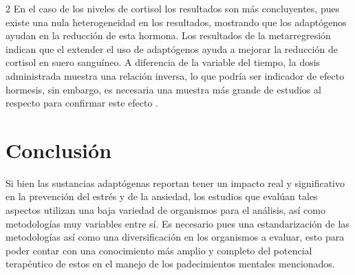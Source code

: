 \begin{multicols}{2}
En el caso de los niveles de cortisol los resultados son más concluyentes, pues existe una nula heterogeneidad en los resultados, mostrando que los adaptógenos ayudan en la reducción de esta hormona. Los resultados de la metarregresión indican que el extender el uso de adaptógenos ayuda a mejorar la reducción de cortisol en suero sanguíneo. A diferencia de la variable del tiempo, la dosis administrada muestra una relación inversa, lo que podría ser indicador de efecto hormesis, sin embargo, es necesaria una muestra más grande de estudios al respecto para confirmar este efecto \citep{wachtelgalor2011}.

\section{Conclusión}

Si bien las sustancias adaptógenas reportan tener un impacto real y significativo en la prevención del estrés y de la ansiedad, los estudios que evalúan tales aspectos utilizan una baja variedad de organismos para el análisis, así como metodologías muy variables entre sí. Es necesario pues una estandarización de las metodologías así como una diversificación en los organismos a evaluar, esto para poder contar con una conocimiento más amplio y completo del potencial terapéutico de estos en el manejo de los padecimientos mentales mencionados.





\end{multicols}